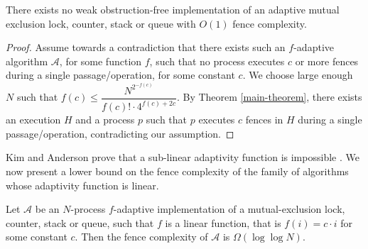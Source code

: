 \begin{corollary}
	There exists no weak obstruction-free implementation of an adaptive mutual exclusion lock, counter, stack or queue with $O(1)$ fence complexity.
\end{corollary}

\begin{proof}
	Assume towards a contradiction that there exists such an $f$-adaptive algorithm $\mathcal{A}$, for some function $f$, such that no process executes $c$ or more fences during a single passage/operation, for some constant $c$. We choose large enough $N$ such that $f(c) \leq \dfrac{N^{2^{-f(c)}}} {f(c)! \cdot 4^{f(c)+2c}}$. By Theorem \ref{main-theorem}, there exists an execution $H$ and a process $p$ such that $p$ executes $c$ fences in $H$ during a single passage/operation, contradicting our assumption.
\end{proof}

Kim and Anderson prove that a sub-linear adaptivity function is impossible \cite{DBLP:journals/dc/KimA12}.
We now present a lower bound on the fence complexity of the family of algorithms whose adaptivity function is linear.


\begin{corollary}
\label{corollary:linear}
Let $\mathcal{A}$ be an $N$-process $f$-adaptive implementation of a mutual-exclusion lock, counter, stack or queue, such that $f$ is a linear function, that is $f(i) = c \cdot i$ for some constant $c$. Then the fence complexity of $\mathcal{A}$ is $\Omega (\log \log N)$.
\end{corollary}

